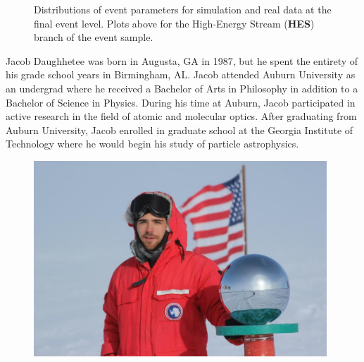 \documentclass{gatech-thesis}
\begin{document}
\begin{figure}
\caption[Final Level HES Event Distributions]{Distributions of event parameters for simulation and real data at the final event level. Plots above for the High-Energy Stream (\textbf{HES}) branch of the event sample.} 
\label{fig:hes_final_level_distros}
\end{figure}

\begin{postliminary}

{}

\begin{vita}
Jacob Daughhetee was born in Augusta, GA in 1987, but he spent the entirety of his grade school years in Birmingham, AL. Jacob attended Auburn University as an undergrad where he received a Bachelor of Arts in Philosophy in addition to a Bachelor of Science in Physics. During his time at Auburn, Jacob participated in active research in the field of atomic and molecular optics. After graduating from Auburn University, Jacob enrolled in graduate school at the Georgia Institute of Technology where he would begin his study of particle astrophysics.

\begin{figure}[ht]
  \begin{center}
    \includegraphics[width=0.98\textwidth,keepaspectratio]{HeroShot.jpg}
  \end{center}
  \label{fig:HeroShot}
\end{figure}

\end{vita}
\end{postliminary}
\end{document}
